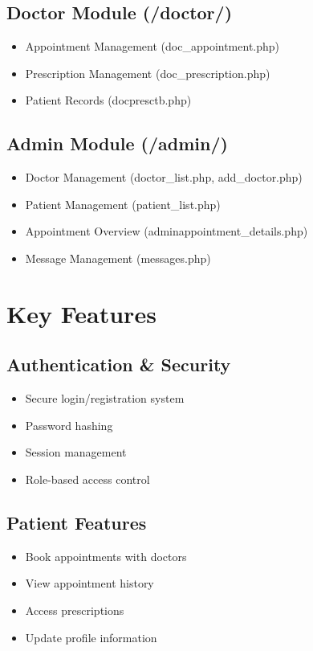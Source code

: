 \documentclass[11pt,a4paper]{article}
\begin{document}
\subsection{Doctor Module (/doctor/)}
\begin{itemize}
    \item Appointment Management (doc\_appointment.php)
    \item Prescription Management (doc\_prescription.php)
    \item Patient Records (docpresctb.php)
\end{itemize}

\subsection{Admin Module (/admin/)}
\begin{itemize}
    \item Doctor Management (doctor\_list.php, add\_doctor.php)
    \item Patient Management (patient\_list.php)
    \item Appointment Overview (adminappointment\_details.php)
    \item Message Management (messages.php)
\end{itemize}

\section{Key Features}

\subsection{Authentication \& Security}
\begin{itemize}
    \item Secure login/registration system
    \item Password hashing
    \item Session management
    \item Role-based access control
\end{itemize}

\subsection{Patient Features}
\begin{itemize}
    \item Book appointments with doctors
    \item View appointment history
    \item Access prescriptions
    \item Update profile information
\end{itemize}
\end{document}
